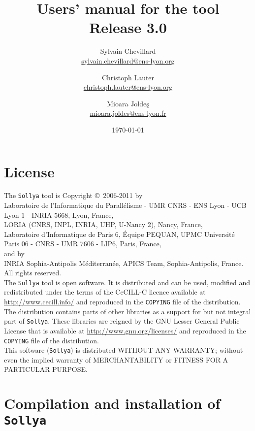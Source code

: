 \documentclass[a4paper]{article}
\title{Users' manual for the \sollya tool \\ {\large Release 3.0}}
\author{Sylvain Chevillard \\ \small{\url{sylvain.chevillard@ens-lyon.org}} \and Christoph Lauter \\ \small{\url{christoph.lauter@ens-lyon.org}} \and Mioara Jolde\c{s} \\ \small{\url{mioara.joldes@ens-lyon.fr}} }
\date{\today}
\newcommand{\sollya}{\texttt{Sollya}\xspace}
\begin{document}
\maketitle

\section*{License}

The \sollya tool is Copyright \copyright~2006-2011 by \vspace{2mm} \\
\indent Laboratoire de
l'Informatique du Parall\'elisme - UMR CNRS - ENS Lyon - UCB Lyon 1 -
INRIA 5668, Lyon, France, \vspace{2mm} \\
\indent LORIA (CNRS, INPL, INRIA, UHP, U-Nancy 2), Nancy, France, \vspace{2mm} \\
\indent Laboratoire d'Informatique de Paris 6, \'Equipe PEQUAN,
UPMC Universit\'e Paris 06 - CNRS - UMR 7606 - LIP6, Paris, France,\vspace{2mm} \\ and by \vspace{2mm} \\
\indent INRIA Sophia-Antipolis M\'editerran\'ee, APICS Team, Sophia-Antipolis, France. \vspace{2mm} \\
All rights reserved.\\[0.2cm]

\noindent The \sollya tool is open software. It is distributed and can be used,
modified and redistributed under the terms of the CeCILL-C licence
available at \url{http://www.cecill.info/} and reproduced in the
\texttt{COPYING} file of the distribution. The distribution contains
parts of other libraries as a support for but not integral part of
\sollya. These libraries are reigned by the GNU Lesser General Public
License that is available at \url{http://www.gnu.org/licenses/} and
reproduced in the \texttt{COPYING} file of the distribution.\\[0.2cm]

\noindent This software (\sollya) is distributed WITHOUT ANY WARRANTY; without even the 
implied warranty of MERCHANTABILITY or FITNESS FOR A PARTICULAR PURPOSE.

\tableofcontents

\section{Compilation and installation of \sollya}
\end{document}
